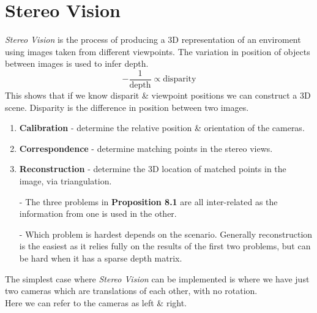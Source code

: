 \documentclass[11pt,a4paper]{article}
\begin{document}
\section{Stereo Vision}

\textit{Stereo Vision} is the process of producing a 3D representation of an enviroment using images taken from different viewpoints. The variation in position of objects between images is used to infer depth.
$$-\frac{1}{\text{depth}}\propto\text{disparity}$$
This shows that if we know disparit \& viewpoint positions we can construct a 3D scene.
\nb Disparity is the difference in position between two images.\\

\begin{enumerate}
	\item \textbf{Calibration} - determine the relative position \& orientation of the cameras.
	\item \textbf{Correspondence} - determine matching points in the stereo views.
	\item \textbf{Reconstruction} - determine the 3D location of matched points in the image, via triangulation.
\end{enumerate}

\begin{itemize}
	\item[-] The three problems in \textbf{Proposition 8.1} are all inter-related as the information from one is used in the other.
	\item[-] Which problem is hardest depends on the scenario. Generally reconstruction is the easiest as it relies fully on the results of the first two problems, but can be hard when it has a sparse depth matrix.
\end{itemize}

The simplest case where \textit{Stereo Vision} can be implemented is where we have just two cameras which are translations of each other, with no rotation.\\
Here we can refer to the cameras as left \& right.\\
\end{document}
